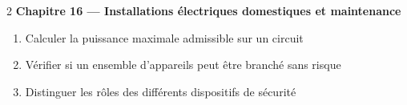 \begin{multicols}{2}
\textbf{\normalsize\color{onbo}Chapitre 16 --- Installations électriques domestiques et maintenance}
\begin{enumerate}[label=\arabic*.,itemsep=1pt,topsep=2pt,leftmargin=1.6em]
\item Calculer la puissance maximale admissible sur un circuit
\item Vérifier si un ensemble d'appareils peut être branché sans risque
\item Distinguer les rôles des différents dispositifs de sécurité
\end{enumerate}
\vspace{4pt}

\end{multicols}
